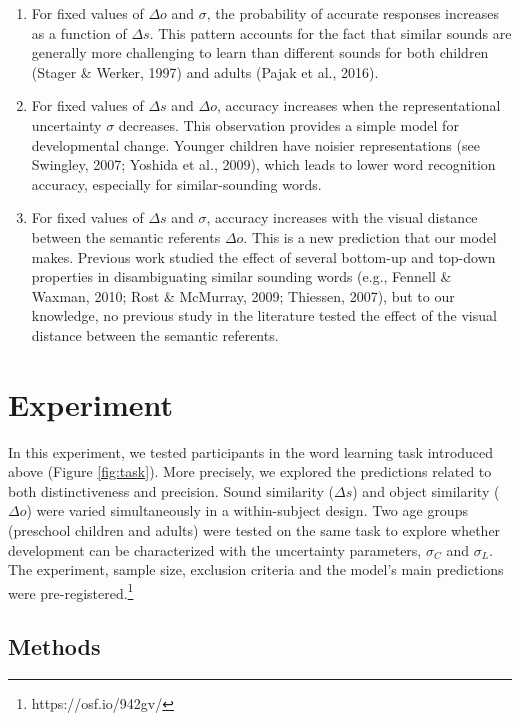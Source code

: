 \documentclass[english,,man,floatsintext]{apa6}
\let\rmarkdownfootnote\footnote%
\def\footnote{\protect\rmarkdownfootnote}
\theoremstyle{definition}
\theoremstyle{definition}
\theoremstyle{definition}
\theoremstyle{remark}
\begin{document}
\begin{enumerate}
\def\labelenumi{\arabic{enumi})}
\item
  For fixed values of \(\Delta o\) and \(\sigma\), the probability of
  accurate responses increases as a function of \(\Delta s\). This
  pattern accounts for the fact that similar sounds are generally more
  challenging to learn than different sounds for both children (Stager
  \& Werker, 1997) and adults (Pajak et al., 2016).
\item
  For fixed values of \(\Delta s\) and \(\Delta o\), accuracy increases
  when the representational uncertainty \(\sigma\) decreases. This
  observation provides a simple model for developmental change. Younger
  children have noisier representations (see Swingley, 2007; Yoshida et
  al., 2009), which leads to lower word recognition accuracy, especially
  for similar-sounding words.
\item
  For fixed values of \(\Delta s\) and \(\sigma\), accuracy increases
  with the visual distance between the semantic referents \(\Delta o\).
  This is a new prediction that our model makes. Previous work studied
  the effect of several bottom-up and top-down properties in
  disambiguating similar sounding words (e.g., Fennell \& Waxman, 2010;
  Rost \& McMurray, 2009; Thiessen, 2007), but to our knowledge, no
  previous study in the literature tested the effect of the visual
  distance between the semantic referents.
\end{enumerate}

\section{Experiment}\label{experiment}

In this experiment, we tested participants in the word learning task
introduced above (Figure \ref{fig:task}). More precisely, we explored
the predictions related to both distinctiveness and precision. Sound
similarity (\(\Delta s\)) and object similarity (\(\Delta o\)) were
varied simultaneously in a within-subject design. Two age groups
(preschool children and adults) were tested on the same task to explore
whether development can be characterized with the uncertainty
parameters, \(\sigma_C\) and \(\sigma_L\). The experiment, sample size,
exclusion criteria and the model's main predictions were
pre-registered.\footnote{https://osf.io/942gv/}

\subsection{Methods}\label{methods}
\end{document}
